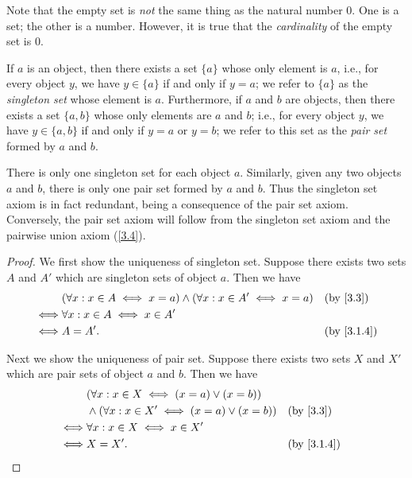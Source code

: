 \begin{rmk}\label{3.1.8}
  Note that the empty set is \emph{not} the same thing as the natural number \(0\).
  One is a set;
  the other is a number.
  However, it is true that the \emph{cardinality} of the empty set is \(0\).
\end{rmk}

\begin{ax}\label{3.3}
  If \(a\) is an object, then there exists a set \(\{a\}\) whose only element is \(a\), i.e., for every object \(y\), we have \(y \in \{a\}\) if and only if \(y = a\);
  we refer to \(\{a\}\) as the \emph{singleton set} whose element is \(a\).
  Furthermore, if \(a\) and \(b\) are objects, then there exists a set \(\{a, b\}\) whose only elements are \(a\) and \(b\);
  i.e., for every object \(y\), we have \(y \in \{a, b\}\) if and only if \(y = a\) or \(y = b\);
  we refer to this set as the \emph{pair set} formed by \(a\) and \(b\).
\end{ax}

\begin{rmk}\label{3.1.9}
  There is only one singleton set for each object \(a\).
  Similarly, given any two objects \(a\) and \(b\), there is only one pair set formed by \(a\) and \(b\).
  Thus the singleton set axiom is in fact redundant, being a consequence of the pair set axiom.
  Conversely, the pair set axiom will follow from the singleton set axiom and the pairwise union axiom (\cref{3.4}).
\end{rmk}

\begin{proof}
  We first show the uniqueness of singleton set.
  Suppose there exists two sets \(A\) and \(A'\) which are singleton sets of object \(a\).
  Then we have
  \begin{align*}
         & (\forall x : x \in A \iff x = a) \land (\forall x : x \in A' \iff x = a) &  & \text{(by \cref{3.3})}   \\
    \iff & \forall x : x \in A \iff x \in A'                                                                      \\
    \iff & A = A'.                                                                  &  & \text{(by \cref{3.1.4})}
  \end{align*}

  Next we show the uniqueness of pair set.
  Suppose there exists two sets \(X\) and \(X'\) which are pair sets of object \(a\) and \(b\).
  Then we have
  \begin{align*}
         & (\forall x : x \in X \iff (x = a) \lor (x = b))                                      \\
         & \land (\forall x : x \in X' \iff (x = a) \lor (x = b)) &  & \text{(by \cref{3.3})}   \\
    \iff & \forall x : x \in X \iff x \in X'                                                    \\
    \iff & X = X'.                                                &  & \text{(by \cref{3.1.4})}
  \end{align*}
\end{proof}

